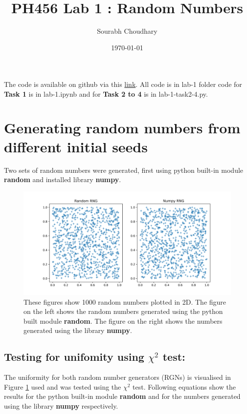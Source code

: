 \documentclass{article}
\title{PH456 Lab 1 : Random Numbers} %
\author{Sourabh Choudhary} %
\date{\today} %
\begin{document}
    
\maketitle %

The code is available on github via this \href{https://github.com/sourabh-ch/ph456-computational}{link}. 
All code is in lab-1 folder code for \textbf{Task 1} is in lab-1.ipynb and for \textbf{Task 2 to 4} is in lab-1-task2-4.py.

\section{Generating random numbers from different initial seeds} %
    
Two sets of random numbers were generated, first using python built-in module \textbf{random} 
and installed library \textbf{numpy}.

\begin{figure}[H]\label{fig:RNGs2D}
    \centering
    \includegraphics[scale = 0.5]{task1.png}
    \caption[Random Numbers]{These figures show 1000 random numbers plotted in 2D. The figure
    on the left shows the random numbers generated using the python built module \textbf{random}. 
    The figure on the right shows the numbers generated using the library \textbf{numpy}.}
\end{figure}

\subsection{Testing for unifomity using $ \chi^2 $ test:}

The uniformity for both random number generators (RGNs) is visualised in Figure \ref{fig:RNGs2D} used 
and was tested using the $ \chi^2 $ test. Following equations show the results for the python 
built-in module \textbf{random} and for the numbers generated using the library \textbf{numpy} 
respectively. 
\end{document}
